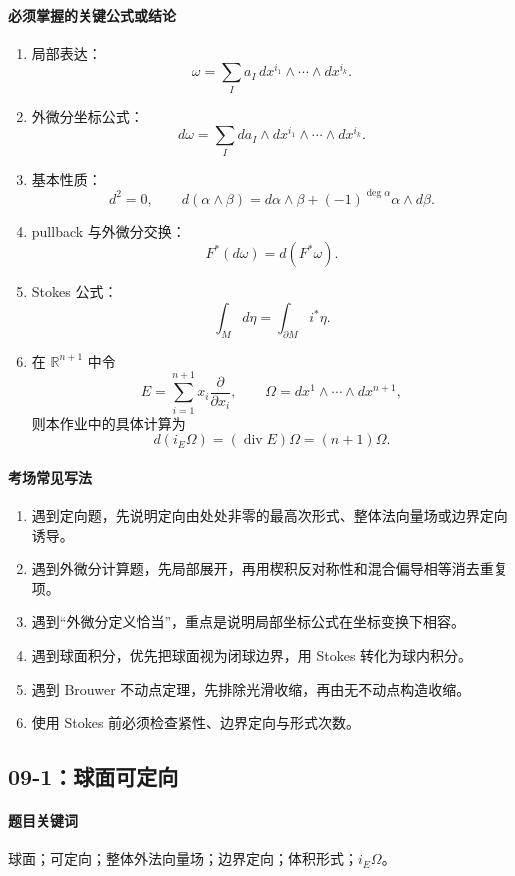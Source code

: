 \documentclass[12pt,a4paper]{ctexart}
\newcommand{\R}{\mathbb R}
\begin{document}
\paragraph{必须掌握的关键公式或结论}
\begin{enumerate}
  \item 局部表达：
  \[
    \omega=\sum_I a_I\,dx^{i_1}\wedge\cdots\wedge dx^{i_k}.
  \]
  \item 外微分坐标公式：
  \[
    d\omega=\sum_I da_I\wedge dx^{i_1}\wedge\cdots\wedge dx^{i_k}.
  \]
  \item 基本性质：
  \[
    d^2=0,\qquad
    d(\alpha\wedge\beta)
    =
    d\alpha\wedge\beta+(-1)^{\deg\alpha}\alpha\wedge d\beta.
  \]
  \item pullback 与外微分交换：
  \[
    F^*(d\omega)=d(F^*\omega).
  \]
  \item Stokes 公式：
  \[
    \int_Md\eta=\int_{\partial M}i^*\eta.
  \]
  \item 在 $\R^{n+1}$ 中令
  \[
    E=\sum_{i=1}^{n+1}x_i\frac{\partial}{\partial x_i},
    \qquad
    \Omega=dx^1\wedge\cdots\wedge dx^{n+1},
  \]
  则本作业中的具体计算为
  \[
    d(i_E\Omega)=(\operatorname{div}E)\Omega=(n+1)\Omega.
  \]
\end{enumerate}

\paragraph{考场常见写法}
\begin{enumerate}
  \item 遇到定向题，先说明定向由处处非零的最高次形式、整体法向量场或边界定向诱导。
  \item 遇到外微分计算题，先局部展开，再用楔积反对称性和混合偏导相等消去重复项。
  \item 遇到“外微分定义恰当”，重点是说明局部坐标公式在坐标变换下相容。
  \item 遇到球面积分，优先把球面视为闭球边界，用 Stokes 转化为球内积分。
  \item 遇到 Brouwer 不动点定理，先排除光滑收缩，再由无不动点构造收缩。
  \item 使用 Stokes 前必须检查紧性、边界定向与形式次数。
\end{enumerate}

\subsection{09-1：球面可定向}

\paragraph{题目关键词}
球面；可定向；整体外法向量场；边界定向；体积形式；$i_E\Omega$。
\end{document}
